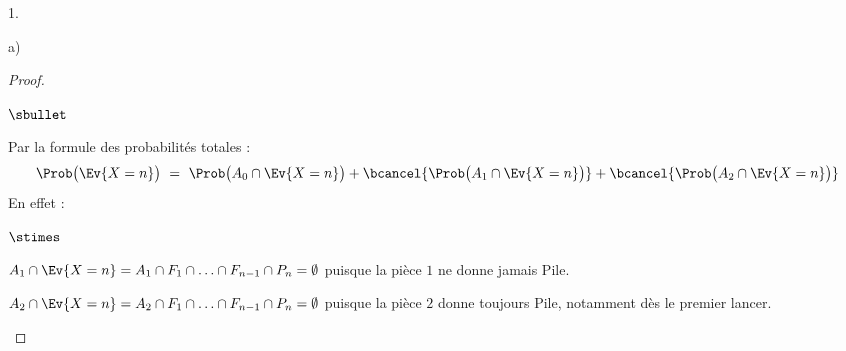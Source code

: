 \begin{noliste}{1.}
\begin{noliste}{a)}
\begin{proof}
\begin{noliste}{$\sbullet$}
      \item Par la formule des probabilités totales :
        \[
        \Prob\big( \Ev{X = n} \big) \ = \ \Prob\big( A_0 \cap \Ev{X =
          n} \big) + \bcancel{\Prob\big( A_1 \cap \Ev{X = n} \big)} +
        \bcancel{\Prob\big( A_2 \cap \Ev{X = n} \big)}
        \]
        En effet :
        \begin{noliste}{$\stimes$}
        \item $A_1 \cap \Ev{X = n} = A_1 \cap F_1 \cap \ldots \cap
          F_{n-1} \cap P_n = \emptyset$ puisque la pièce $1$ ne donne
          jamais Pile.

        \item $A_2 \cap \Ev{X = n} = A_2 \cap F_1 \cap \ldots \cap
          F_{n-1} \cap P_n = \emptyset$ puisque la pièce $2$ donne
          toujours Pile, notamment dès le premier lancer.
        \end{noliste}


\end{noliste}
\end{proof}
\end{noliste}
\end{noliste}

